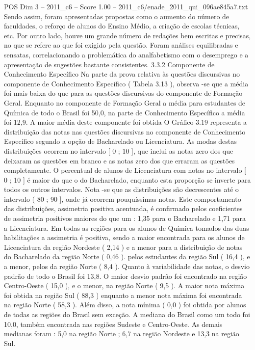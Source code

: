 \begin{textsample}{POS Dim 3 – 2011\_c6 – Score 1.00 – 2011\_c6/enade\_2011\_qui\_096ae845a7.txt}
Sendo assim, foram apresentadas propostas como o aumento do número de faculdades, o reforço de alunos do Ensino Médio, a criação de escolas técnicas, etc.
Por outro lado, houve um grande número de redações bem escritas e precisas, no que se refere ao que foi exigido pela questão.
Foram análises equilibradas e sensatas, correlacionando a problemática do analfabetismo com o desemprego e a apresentação de sugestões bastante consistentes. 3.3.2 Componente de Conhecimento Específico Na parte da prova relativa às questões discursivas no componente de Conhecimento Específico ( Tabela 3.13 ), observa -se que a média foi mais baixa do que para as questões discursivas do componente de Formação Geral.
Enquanto no componente de Formação Geral a média para estudantes de Química de todo o Brasil foi 50,0, na parte de Conhecimento Específico a média foi 12,9.
A maior média deste componente foi obtida O Gráfico 3.19 representa a distribuição das notas nas questões discursivas no componente de Conhecimento Específico segundo a opção de Bacharelado ou Licenciatura.
As modas destas distribuições ocorrem no intervalo [ 0 ; 10 ], que inclui as notas zero dos que deixaram as questões em branco e as notas zero dos que erraram as questões completamente.
O percentual de alunos de Licenciatura com notas no intervalo [ 0 ; 10 ] é maior do que o do Bacharelado, enquanto esta proporção se inverte para todos os outros intervalos.
Nota -se que as distribuições são decrescentes até o intervalo ( 80 ; 90 ], onde já ocorrem pouquíssimas notas.
Este comportamento das distribuições, assimetria positiva acentuada, é confirmado pelos coeficientes de assimetria positivos maiores do que um : 1,35 para o Bacharelado e 1,71 para a Licenciatura.
Em todas as regiões para os alunos de Química tomados das duas habilitações a assimetria é positiva, sendo a maior encontrada para os alunos de Licenciatura da região Nordeste ( 2,14 ) e a menor para a distribuição de notas do Bacharelado da região Norte ( 0,46 ). pelos estudantes da região Sul ( 16,4 ), e a menor, pelos da região Norte ( 8,4 ).
Quanto à variabilidade das notas, o desvio padrão de todo o Brasil foi 13,8.
O maior desvio padrão foi encontrado na região Centro-Oeste ( 15,0 ), e o menor, na região Norte ( 9,5 ).
A maior nota máxima foi obtida na região Sul ( 88,3 ) enquanto a menor nota máxima foi encontrada na região Norte ( 58,3 ).
Além disso, a nota mínima ( 0,0 ) foi obtida por alunos de todas as regiões do Brasil sem exceção.
A mediana do Brasil como um todo foi 10,0, também encontrada nas regiões Sudeste e Centro-Oeste.
As demais medianas foram : 5,0 na região Norte ; 6,7 na região Nordeste e 13,3 na região Sul.

\end{textsample}
